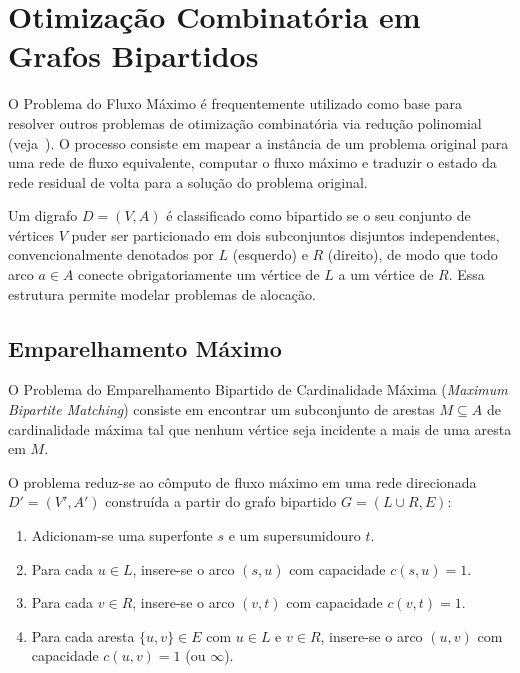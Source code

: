 \chapter{Otimização Combinatória em Grafos Bipartidos}\label{sec:bipartidos}
O Problema do Fluxo Máximo é frequentemente utilizado como base para resolver outros problemas de otimização combinatória via redução polinomial (veja~\cite{cook1998combinatorial}). O processo consiste em mapear a instância de um problema original para uma rede de fluxo equivalente, computar o fluxo máximo e traduzir o estado da rede residual de volta para a solução do problema original.

Um digrafo $D = (V, A)$ é classificado como bipartido se o seu conjunto de vértices $V$ puder ser particionado em dois subconjuntos disjuntos independentes, convencionalmente denotados por $L$ (esquerdo) e $R$ (direito), de modo que todo arco $a \in A$ conecte obrigatoriamente um vértice de $L$ a um vértice de $R$. Essa estrutura permite modelar problemas de alocação.


\section{Emparelhamento Máximo}\label{sec:emparelhamento}

O Problema do Emparelhamento Bipartido de Cardinalidade Máxima (\textit{Maximum Bipartite Matching}) consiste em encontrar um subconjunto de arestas $M \subseteq A$ de cardinalidade máxima tal que nenhum vértice seja incidente a mais de uma aresta em $M$.

O problema reduz-se ao cômputo de fluxo máximo em uma rede direcionada $D' = (V', A')$ construída a partir do grafo bipartido $G = (L \cup R, E)$:
\begin{enumerate}
    \item Adicionam-se uma superfonte $s$ e um supersumidouro $t$.
    \item Para cada $u \in L$, insere-se o arco $(s, u)$ com capacidade $c(s,u) = 1$.
    \item Para cada $v \in R$, insere-se o arco $(v, t)$ com capacidade $c(v,t) = 1$.
    \item Para cada aresta $\{u,v\} \in E$ com $u \in L$ e $v \in R$, insere-se o arco $(u, v)$ com capacidade $c(u,v) = 1$ (ou $\infty$).
\end{enumerate}

